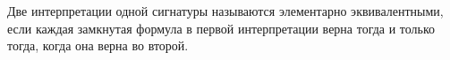 Две интерпретации одной сигнатуры называются элементарно эквивалентными, если каждая замкнутая формула в первой интерпретации
верна тогда и только тогда, когда она верна во второй.
